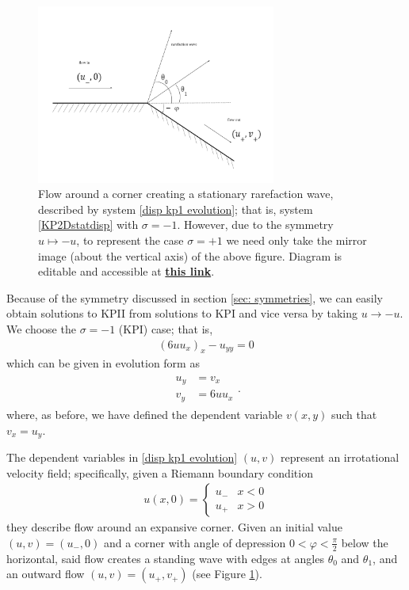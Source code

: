 \documentclass[12pt]{article}
\numberwithin{equation}{section}
\begin{document}
\begin{figure}
    \centering
    \includegraphics[width = 0.7\textwidth]{figures/Stationary KP diagram.png}
    \caption{Flow around a corner creating a stationary rarefaction wave, described by system \ref{disp kp1 evolution}; that is, system \ref{KP2Dstatdisp} with $\sigma = -1$. However, due to the symmetry $u \mapsto -u$, to represent the case $\sigma = +1$ we need only take the mirror image (about the vertical axis) of the above figure. Diagram is editable and accessible at \href{https://docs.google.com/drawings/d/1szWVgUYcond4bVDgIpK8ZXEmS2uC1-2WPGRDoJfGp7Y/edit?usp=sharing}{\bf this link}.}
    \label{fig:stationarydiagram}
\end{figure}
Because of the symmetry discussed in section \ref{sec: symmetries}, we can easily obtain solutions to KPII from solutions to KPI and vice versa by taking $u \to -u$. We choose the $\sigma = -1$ (KPI) case; that is,
\begin{align}
    (6uu_x)_x - u_{yy}=0\label{minus1}
\end{align}
which can be given in evolution form as
\begin{align}
\begin{array}{rl}
    u_y &= v_x \\
     v_y &= 6uu_x 
\end{array}.
\label{disp kp1 evolution}
\end{align}
where, as before, we have defined the dependent variable $v(x,y)$ such that $v_x = u_y$.

The dependent variables in \eqref{disp kp1 evolution} $(u,v)$ represent an irrotational velocity field; specifically, given a Riemann boundary condition
\begin{align}
    u(x,0) = \left\{\begin{array}{cc}
        u_- & x<0 \\
        u_+ & x>0
    \end{array}
    \right.
\end{align}
they describe flow around an expansive corner. Given an initial value $(u,v)=(u_-,0)$ and a corner with angle of depression $0<\varphi<\frac{\pi}{2}$ below the horizontal, said flow creates a standing wave with edges at angles $\theta_0$ and $\theta_1$, and an outward flow $(u,v)=(u_+,v_+)$ (see Figure \ref{fig:stationarydiagram}).
\end{document}
